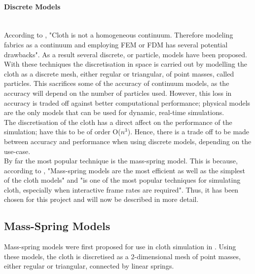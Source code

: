 \paragraph{Discrete Models}\leavevmode\\
According to \textcite[2]{Choi2002}, "Cloth is not a homogeneous continuum. Therefore modeling fabrics as a continuum and employing FEM or FDM has several potential drawbacks". As a result several discrete, or particle, models have been proposed.
\\With these techniques the discretisation in space is carried out by modelling the cloth as a discrete mesh, either regular or triangular, of point masses, called particles. This sacrifices some of the accuracy of continuum models, as the accuracy will depend on the number of particles used. However, this loss in accuracy is traded off against better computational performance; physical models are the only models that can be used for dynamic, real-time simulations.
\\The discretisation of the cloth has a direct affect on the performance of the simulation; \textcite[5]{Volino2001} have this to be of order O($n^{3}$). Hence, there is a trade off to be made between accuracy and performance when using discrete models, depending on the use-case.
\\By far the most popular technique is the mass-spring model. This is because, according to \textcite[2]{Zink2007}, "Mass-spring models are the most efficient as well as the simplest of the cloth models" and "is one of the most popular techniques for simulating cloth, especially when interactive frame rates are required". Thus, it has been chosen for this project and will now be described in more detail.

\subsection{Mass-Spring Models}
Mass-spring models were first proposed for use in cloth simulation in \textcite{Provot2001}. Using these models, the cloth is discretised as a 2-dimensional mesh of point masses, either regular or triangular, connected by linear springs.

